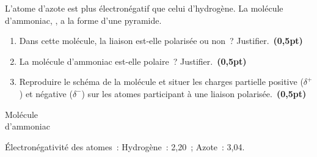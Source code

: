 \begin{minipage}{0.84\linewidth}
    L'atome d'azote est plus électronégatif que celui d'hydrogène. La molécule
    d'ammoniac, , a la forme d'une pyramide.

    \begin{enumerate}
        \item Dans cette molécule, la liaison  est-elle polarisée
              ou non~? Justifier.~\textbf{(0,5pt)}
        \item La molécule d'ammoniac est-elle polaire~?
              Justifier.~\textbf{(0,5pt)}
        \item Reproduire le schéma de la molécule et situer les charges
              partielle positive ($\delta^{+}$) et négative ($\delta^{-}$) sur
              les atomes participant à une liaison polarisée.~\textbf{(0,5pt)}
    \end{enumerate}
\end{minipage}
\hfill
\begin{minipage}{0.14\linewidth}
\begin{center}
    {Molécule \\ d'ammoniac}
\end{center}
\end{minipage}

\begin{donnees}
    Électronégativité des atomes~:
    Hydrogène~: 2,20~; Azote~: 3,04.
\end{donnees}
